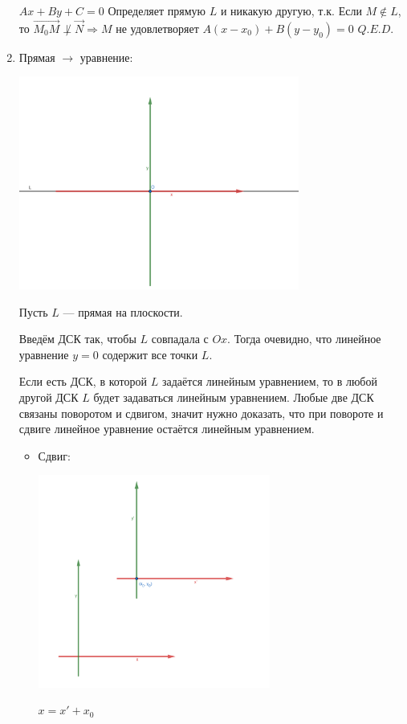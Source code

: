 \documentclass[twoside]{book}
\begin{document}
\begin{enumerate}
          \(Ax + By + C = 0\) Определяет прямую \(L\) и никакую другую, т.к. Если \(M \notin L\), то \(\overrightarrow{M_0 M} \not\perp \vec N \Rightarrow M \text{ не удовлетворяет } A(x - x_0) + B(y - y_0) = 0\) \(Q.E.D.\)
    \item Прямая \(\rightarrow\) уравнение:
          \begin{center}
              \includegraphics[height=7cm]{Images/Chapter_1/2-1-2.png}
          \end{center}
          Пусть \(L\) --- прямая на плоскости.

          Введём ДСК так, чтобы \(L\) совпадала с \(Ox\). Тогда очевидно, что линейное уравнение \(y = 0\) содержит все точки \(L\).

          Если есть ДСК, в которой \(L\) задаётся линейным уравнением, то в любой другой ДСК \(L\) будет задаваться линейным уравнением.
          Любые две ДСК связаны поворотом и сдвигом, значит нужно доказать, что при повороте и сдвиге линейное уравнение остаётся линейным уравнением.

          \begin{itemize}
              \item Сдвиг:
                    \begin{center}
                        \includegraphics[height=7cm]{Images/Chapter_1/2-1-3.png}
                    \end{center}
                    \(x = x' + x_0\)


\end{itemize}
\end{enumerate}
\end{document}
